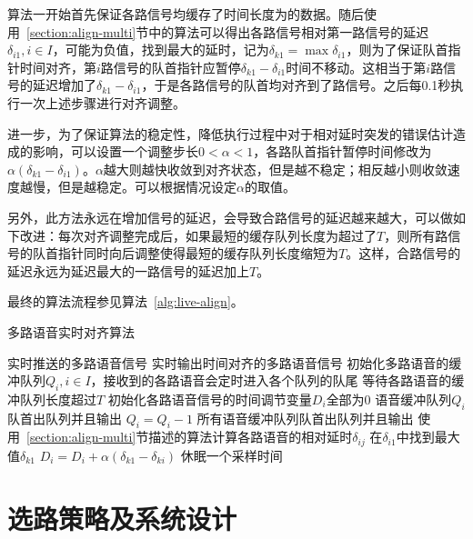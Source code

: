 算法一开始首先保证各路信号均缓存了时间长度为的数据。随后使用~\ref{section:align-multi}节中的算法可以得出各路信号相对第一路信号的延迟$\delta_{i1}, i \in I$，可能为负值，找到最大的延时，记为$\delta_{k1} = \max \delta_{i1}$，则为了保证队首指针时间对齐，第$i$路信号的队首指针应暂停$\delta_{k1}-\delta_{i1}$时间不移动。这相当于第$i$路信号的延迟增加了$\delta_{k1}-\delta_{i1}$，于是各路信号的队首均对齐到了路信号。之后每0.1秒执行一次上述步骤进行对齐调整。

进一步，为了保证算法的稳定性，降低执行过程中对于相对延时突发的错误估计造成的影响，可以设置一个调整步长$0<\alpha<1$，各路队首指针暂停时间修改为$\alpha(\delta_{k1}-\delta_{i1})$。$\alpha$越大则越快收敛到对齐状态，但是越不稳定；相反越小则收敛速度越慢，但是越稳定。可以根据情况设定$\alpha$的取值。

另外，此方法永远在增加信号的延迟，会导致合路信号的延迟越来越大，可以做如下改进：每次对齐调整完成后，如果最短的缓存队列长度为超过了$T$，则所有路信号的队首指针同时向后调整使得最短的缓存队列长度缩短为$T$。这样，合路信号的延迟永远为延迟最大的一路信号的延迟加上$T$。

最终的算法流程参见算法~\ref{alg:live-align}。

\begin{algorithm}
    \caption{多路语音实时对齐算法}
    \label{alg:live-align}
\begin{algorithmic}[1]
\INPUT
    \Statex 实时推送的多路语音信号
\OUTPUT
    \Statex 实时输出时间对齐的多路语音信号
\State 初始化多路语音的缓冲队列$Q_i, i\in I$，接收到的各路语音会定时进入各个队列的队尾
\State 等待各路语音的缓冲队列长度超过$T$
\State 初始化各路语音信号的时间调节变量$D_i$全部为0
            \State 语音缓冲队列$Q_i$队首出队列并且输出
        \Else
            \State $Q_i = Q_i - 1$
        \EndIf
    \EndFor
        \State 所有语音缓冲队列队首出队列并且输出
    \EndIf
        \State 使用~\ref{section:align-multi}节描述的算法计算各路语音的相对延时$\delta_{ij}$
        \State 在$\delta_{i1}$中找到最大值$\delta_{k1}$
            \State $D_i = D_i + \alpha(\delta_{k1}-\delta_{ki})$
        \EndFor
    \EndIf
    \State 休眠一个采样时间
\EndWhile
\end{algorithmic}
\end{algorithm}

\section{选路策略及系统设计}

